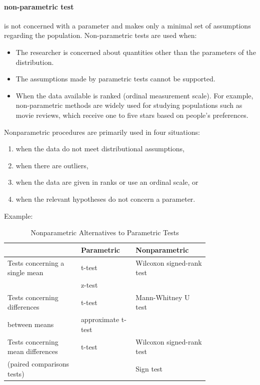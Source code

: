 \paragraph{non-parametric test} %
\label{par:non-parametric test}
is not concerned with a parameter and makes only a minimal set of assumptions regarding the population. Non-parametric tests are used when:
\begin{itemize}
	\item[-] The researcher is concerned about quantities other than the parameters of the distribution.
	\item[-] The assumptions made by parametric tests cannot be supported.
	\item[-] When the data available is ranked (ordinal measurement scale). For example, non-parametric methods are widely used for studying populations such as movie reviews, which receive one to five stars based on people's preferences.
\end{itemize}
Nonparametric procedures are primarily used in four situations:
\begin{enumerate}
	\item when the data do not meet distributional assumptions,
	\item when there are outliers,
	\item when the data are given in ranks or use an ordinal scale, or
	\item when the relevant hypotheses do not concern a parameter.
\end{enumerate}
Example:
\begin{table}[H]
	\caption{Nonparametric Alternatives to Parametric Tests}
	\begin{center}
		\label{tab:Nonparametric Tests}
		\begin{tabular}{p{0.3\linewidth} | p{0.2\linewidth} | p{0.3\linewidth}}
			\toprule
			                                  & \textbf{Parametric} & \textbf{Nonparametric}    \\
			\midrule
			Tests concerning a single mean    & t-test              & Wilcoxon signed-rank test \\
			                                  & z-test              &                           \\
			\midrule
			Tests concerning differences      & t-test              & Mann-Whitney U test       \\
			between means                     & approximate t-test  &                           \\
			\midrule
			Tests concerning mean differences & t-test              & Wilcoxon signed-rank test \\
			(paired comparisons tests)        &                     & Sign test                 \\
			\bottomrule
		\end{tabular}
	\end{center}
\end{table}
